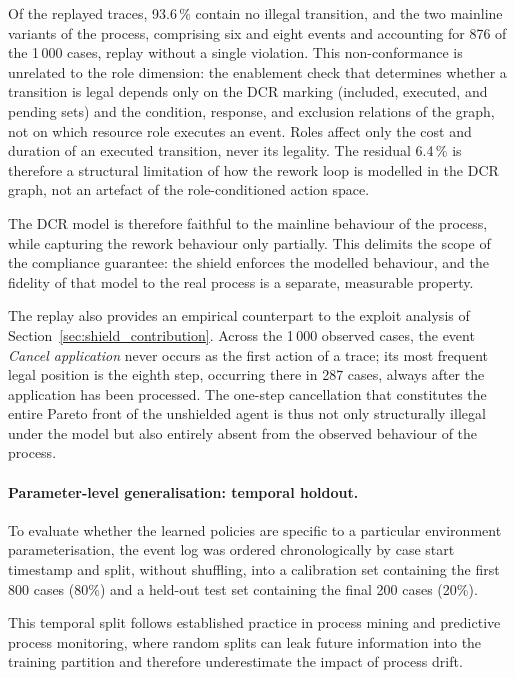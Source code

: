 Of the replayed traces, 93.6\,\% contain no illegal transition, and
the two mainline variants of the process, comprising six and eight
events and accounting for 876 of the 1\,000 cases, replay without a
single violation. This non-conformance is unrelated to the role dimension: the enablement check that determines whether a transition is legal depends only on the \ac{DCR} marking (included, executed, and pending sets) and the condition, response, and exclusion relations of the graph, not on which
resource role executes an event. Roles affect only the cost and duration
of an executed transition, never its legality. The residual 6.4\,\% is
therefore a structural limitation of how the rework loop is modelled in
the \ac{DCR} graph, not an artefact of the role-conditioned action space.

The \ac{DCR} model is therefore faithful to the mainline behaviour of
the process, while capturing the rework behaviour only partially. This
delimits the scope of the compliance guarantee: the shield enforces
the modelled behaviour, and the fidelity of that model to the real
process is a separate, measurable property.

The replay also provides an empirical counterpart to the exploit
analysis of Section~\ref{sec:shield_contribution}. Across the 1\,000
observed cases, the event \textit{Cancel application} never occurs as
the first action of a trace; its most frequent legal position is the
eighth step, occurring there in 287 cases, always after the
application has been processed. The one-step cancellation that
constitutes the entire Pareto front of the unshielded agent is thus
not only structurally illegal under the model but also entirely absent
from the observed behaviour of the process.

\paragraph{Parameter-level generalisation: temporal holdout.}

To evaluate whether the learned policies are specific to a particular
environment parameterisation, the event log was ordered
chronologically by case start timestamp and split, without
shuffling, into a calibration set containing the first 800 cases
(80\%) and a held-out test set containing the final 200 cases
(20\%).

This temporal split follows established practice in process mining
and predictive process monitoring, where random splits can leak
future information into the training partition and therefore
underestimate the impact of process drift.

